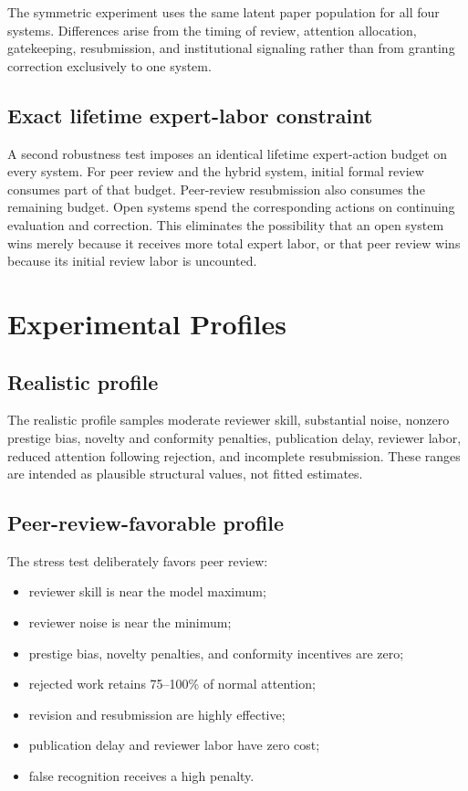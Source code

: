 \documentclass[11pt]{article}
\begin{document}
The symmetric experiment uses the same latent paper population for all four systems. Differences arise from the timing of review, attention allocation, gatekeeping, resubmission, and institutional signaling rather than from granting correction exclusively to one system.

\subsection{Exact lifetime expert-labor constraint}

A second robustness test imposes an identical lifetime expert-action budget on every system. For peer review and the hybrid system, initial formal review consumes part of that budget. Peer-review resubmission also consumes the remaining budget. Open systems spend the corresponding actions on continuing evaluation and correction. This eliminates the possibility that an open system wins merely because it receives more total expert labor, or that peer review wins because its initial review labor is uncounted.

\section{Experimental Profiles}

\subsection{Realistic profile}

The realistic profile samples moderate reviewer skill, substantial noise, nonzero prestige bias, novelty and conformity penalties, publication delay, reviewer labor, reduced attention following rejection, and incomplete resubmission. These ranges are intended as plausible structural values, not fitted estimates.

\subsection{Peer-review-favorable profile}

The stress test deliberately favors peer review:

\begin{itemize}
    \item reviewer skill is near the model maximum;
    \item reviewer noise is near the minimum;
    \item prestige bias, novelty penalties, and conformity incentives are zero;
    \item rejected work retains 75--100\% of normal attention;
    \item revision and resubmission are highly effective;
    \item publication delay and reviewer labor have zero cost;
    \item false recognition receives a high penalty.
\end{itemize}
\end{document}
